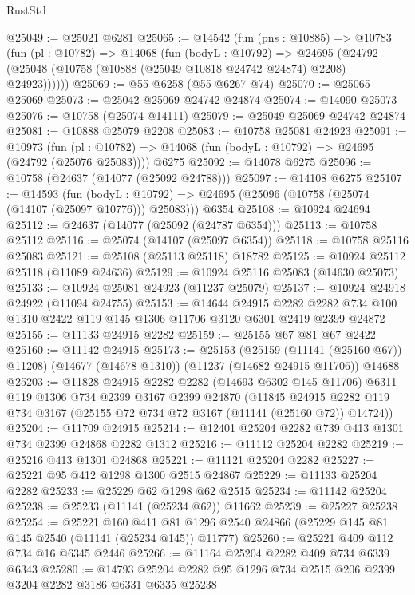 \begin{lexlean}{RustStd}
\begin{coremodule}
@25049 := @25021 @6281
@25065 := @14542
    (fun (pns : @10885) =>
    @10783
      (fun (pl : @10782) =>
      @14068
        (fun (bodyL : @10792) =>
        @24695 (@24792 (@25048 (@10758 (@10888 (@25049 @10818 @24742 @24874) @2208) @24923))))))
@25069 := @55 @6258 (@55 @6267 @74)
@25070 := @25065 @25069
@25073 := @25042 @25069 @24742 @24874
@25074 := @14090 @25073
@25076 := @10758 (@25074 @14111)
@25079 := @25049 @25069 @24742 @24874
@25081 := @10888 @25079 @2208
@25083 := @10758 @25081 @24923
@25091 := @10973
    (fun (pl : @10782) => @14068 (fun (bodyL : @10792) => @24695 (@24792 (@25076 @25083))))
    @6275
@25092 := @14078 @6275
@25096 := @10758 (@24637 (@14077 (@25092 @24788)))
@25097 := @14108 @6275
@25107 := @14593
    (fun (bodyL : @10792) => @24695 (@25096 (@10758 (@25074 (@14107 (@25097 @10776))) @25083)))
    @6354
@25108 := @10924 @24694
@25112 := @24637 (@14077 (@25092 (@24787 @6354)))
@25113 := @10758 @25112
@25116 := @25074 (@14107 (@25097 @6354))
@25118 := @10758 @25116 @25083
@25121 := @25108 (@25113 @25118) @18782
@25125 := @10924 @25112 @25118 (@11089 @24636)
@25129 := @10924 @25116 @25083 (@14630 @25073)
@25133 := @10924 @25081 @24923 (@11237 @25079)
@25137 := @10924 @24918 @24922 (@11094 @24755)
@25153 := @14644
    @24915
    @2282
    @2282
    @734
    @100
    @1310
    @2422
    @119
    @145
    @1306
    @11706
    @3120
    @6301
    @2419
    @2399
    @24872
@25155 := @11133 @24915 @2282
@25159 := @25155 @67 @81 @67 @2422
@25160 := @11142 @24915
@25173 := @25153
    (@25159 (@11141 (@25160 @67)) @11208)
    (@14677 (@14678 @1310))
    (@11237 (@14682 @24915 @11706))
    @14688
@25203 := @11828
    @24915
    @2282
    @2282
    (@14693 @6302 @145 @11706)
    @6311
    @119
    @1306
    @734
    @2399
    @3167
    @2399
    @24870
    (@11845 @24915 @2282 @119 @734 @3167 (@25155 @72 @734 @72 @3167 (@11141 (@25160 @72)) @14724))
@25204 := @11709 @24915
@25214 := @12401 @25204 @2282 @739 @413 @1301 @734 @2399 @24868 @2282 @1312
@25216 := @11112 @25204 @2282
@25219 := @25216 @413 @1301 @24868
@25221 := @11121 @25204 @2282
@25227 := @25221 @95 @412 @1298 @1300 @2515 @24867
@25229 := @11133 @25204 @2282
@25233 := @25229 @62 @1298 @62 @2515
@25234 := @11142 @25204
@25238 := @25233 (@11141 (@25234 @62)) @11662
@25239 := @25227 @25238
@25254 := @25221
    @160
    @411
    @81
    @1296
    @2540
    @24866
    (@25229 @145 @81 @145 @2540 (@11141 (@25234 @145)) @11777)
@25260 := @25221 @409 @112 @734 @16 @6345 @2446
@25266 := @11164 @25204 @2282 @409 @734 @6339 @6343
@25280 := @14793 @25204 @2282 @95 @1296 @734 @2515 @206 @2399 @3204 @2282 @3186 @6331 @6335 @25238

\end{coremodule}
\end{lexlean}
